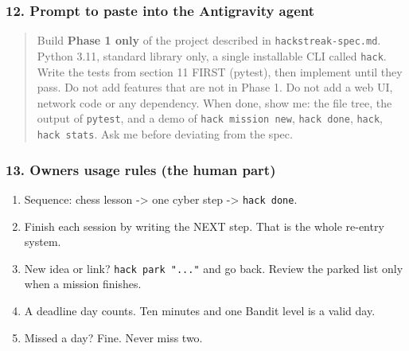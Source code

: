 \hypertarget{hackstreak-spec-12-prompt-to-paste-into-the-antigravity-agent}{%
\subsubsection{12. Prompt to paste into the Antigravity
agent}\label{hackstreak-spec-12-prompt-to-paste-into-the-antigravity-agent}}

\begin{quote}
Build \textbf{Phase 1 only} of the project described in
\texttt{hackstreak-spec.md}. Python 3.11, standard library only, a
single installable CLI called \texttt{hack}. Write the tests from
section 11 FIRST (pytest), then implement until they pass. Do not add
features that are not in Phase 1. Do not add a web UI, network code or
any dependency. When done, show me: the file tree, the output of
\texttt{pytest}, and a demo of \texttt{hack mission new},
\texttt{hack done}, \texttt{hack}, \texttt{hack stats}. Ask me before
deviating from the spec.
\end{quote}

\hypertarget{hackstreak-spec-13-owners-usage-rules-the-human-part}{%
\subsubsection{13. Owner\textquotesingle s usage rules (the human
part)}\label{hackstreak-spec-13-owners-usage-rules-the-human-part}}

\begin{enumerate}
\def\labelenumi{\arabic{enumi}.}
\tightlist
\item
  Sequence: chess lesson -\textgreater{} one cyber step -\textgreater{}
  \texttt{hack done}.
\item
  Finish each session by writing the NEXT step. That is the whole
  re-entry system.
\item
  New idea or link? \texttt{hack park "..."} and go back. Review the
  parked list only when a mission finishes.
\item
  A deadline day counts. Ten minutes and one Bandit level is a valid
  day.
\item
  Missed a day? Fine. Never miss two.
\end{enumerate}
